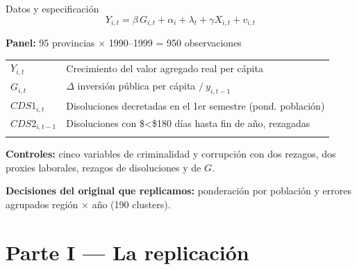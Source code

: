 \documentclass[
  10pt,
  ignorenonframetext,
  aspectratio=169,
  spanish,
]{beamer}
\newcounter{none} %
\begin{document}
\begin{frame}{Datos y especificación}
\protect{}\label{datos-y-especificaciuxf3n}
\[Y_{i,t} = \beta\, G_{i,t} + \alpha_i + \lambda_t + \gamma X_{i,t} + v_{i,t}\]

\vspace{0.2cm}

\textbf{Panel:} 95 provincias \(\times\) 1990--1999 = 950 observaciones

\vspace{0.2cm}

\small

{\def\LTcaptype{none} %
\begin{longtable}[]{@{}
  >{\raggedright\arraybackslash}p{}
  >{\raggedright\arraybackslash}p{}@{}}
\toprule\noalign{}
\endhead
\(Y_{i,t}\) & Crecimiento del valor agregado real per cápita \\
\(G_{i,t}\) & \(\Delta\) inversión pública per cápita
\(/\ y_{i,t-1}\) \\
\(CDS1_{i,t}\) & Disoluciones decretadas en el 1er semestre (pond.
población) \\
\(CDS2_{i,t-1}\) & Disoluciones con \$\textless\$180 días hasta fin de
año, rezagadas \\
\bottomrule\noalign{}
\end{longtable}
}

\normalsize

\vspace{0.3cm}

\textbf{Controles:} cinco variables de criminalidad y corrupción con dos
rezagos, dos proxies laborales, rezagos de disoluciones y de \(G\).

\textbf{Decisiones del original que replicamos:} ponderación por
población y errores agrupados región \(\times\) año (190 clusters).
\end{frame}

\section{Parte I --- La replicación}\label{parte-i-la-replicaciuxf3n}
\end{document}
